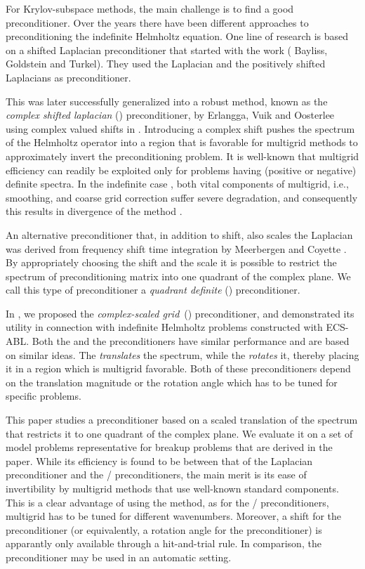 \documentclass[mathpazo]{cicp}
\theoremstyle{definition}
\numberwithin{equation}{section}
\providecommand{\wv}{}
\providecommand{\hbz}{}
\begin{document}
For \hbz{Krylov-subspace methods, the main challenge is to} find a good preconditioner.
Over the years there have been different approaches to preconditioning the \hbz{indefinite} Helmholtz equation. One line of research is based on a shifted Laplacian preconditioner that started with the work \cite{Bayliss83, Bayliss85} ( Bayliss, Goldstein and Turkel).  
They used the Laplacian and the positively shifted Laplacians as preconditioner. 

This was later successfully generalized into a robust method, known as
the {\it complex shifted laplacian} () preconditioner, by Erlangga,
Vuik and Oosterlee using complex valued shifts in
\cite{Yogi04,Yogi06}. Introducing a complex shift pushes the spectrum
of the Helmholtz operator into a region \hbz{that is favorable} for multigrid methods \cite{Achi77,Stu82,Trot01} to
approximately invert the preconditioning problem. It is well-known that multigrid efficiency can readily be exploited \hbz{only} for problems having (positive or negative) definite \hbz{spectra}. In the indefinite case \cite{Trot01}, both vital components of multigrid, i.e., smoothing, and coarse grid correction suffer severe degradation, and consequently this results in
divergence of the method \cite{EEL01}.

An alternative preconditioner that, in addition to shift, also scales
the Laplacian was derived from frequency shift time integration by
Meerbergen and Coyette \cite{meerbergen2009}.  By appropriately
choosing the shift and the scale it is possible to restrict the
spectrum of preconditioning matrix into one quadrant of the complex
plane.  We call this type of preconditioner a {\it quadrant definite}
() preconditioner.

In \cite{reps2009}, we proposed the {\it complex-scaled grid}\, () preconditioner, 
and demonstrated its utility in connection with indefinite Helmholtz 
problems constructed with ECS-ABL. Both the  and the  preconditioners have similar performance 
and are based on similar ideas. The  \textit{translates} the spectrum, while the  \textit{rotates}
 it, \hbz{thereby placing it in a region which is multigrid favorable}. Both of these preconditioners depend on the 
translation magnitude or the rotation angle which has to be tuned for specific problems. 

This paper \wv{studies} a preconditioner based on a scaled translation
of the spectrum \wv{that} restricts it to one quadrant of the complex
plane. \wv{We evaluate it on a set of model problems representative for
breakup problems that are derived in the paper.}  \hbz{While its efficiency is found to be between that of the Laplacian
preconditioner and the / preconditioners, the main merit is its ease of invertibility by multigrid methods that use well-known standard components. This is a clear advantage of using the  method, as for the / preconditioners, multigrid has to be tuned for different wavenumbers. Moreover, a shift for the  preconditioner (or equivalently, a rotation angle for the  preconditioner) is apparantly only available through a hit-and-trial rule. In comparison, the  preconditioner may be used in an automatic setting.}
\end{document}
